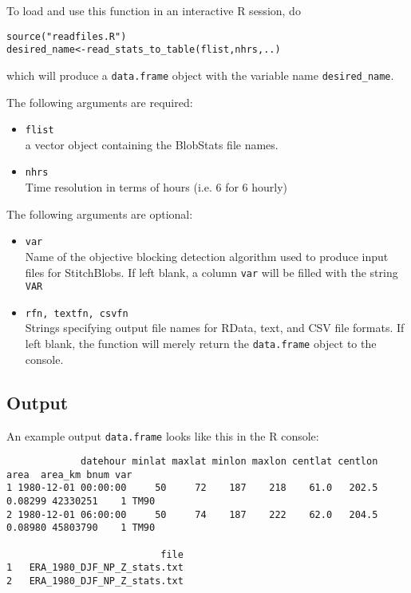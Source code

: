 \documentclass{article}
\begin{document}
To load and use  this function in an interactive R session, do
\begin{verbatim}
source("readfiles.R")
desired_name<-read_stats_to_table(flist,nhrs,..)
\end{verbatim}

which will produce a \texttt{data.frame} object with the variable name \texttt{desired\_name}.

The following arguments are required:
\begin{itemize}
\item[] \texttt{flist}\\ a vector object containing the BlobStats file names.
\item[] \texttt{nhrs}\\ Time resolution in terms of hours (i.e. 6 for 6 hourly)
\end{itemize}

The following arguments are optional:
\begin{itemize}
\item[] \texttt{var}\\ Name of the objective blocking detection algorithm used to produce input files for StitchBlobs. If left blank, a column \texttt{var} will be filled with the string \texttt{VAR}
\item[] \texttt{rfn, textfn, csvfn}\\Strings specifying output file names for RData, text, and CSV file formats. If left blank, the function will merely return the \texttt{data.frame} object to the console.
\end{itemize}

\subsection{Output}\label{tableoutput}

An example output \texttt{data.frame} looks like this in the R console:
\begin{verbatim}
             datehour minlat maxlat minlon maxlon centlat centlon    area  area_km bnum var
1 1980-12-01 00:00:00     50     72    187    218    61.0   202.5 0.08299 42330251    1 TM90
2 1980-12-01 06:00:00     50     74    187    222    62.0   204.5 0.08980 45803790    1 TM90

                           file
1   ERA_1980_DJF_NP_Z_stats.txt
2   ERA_1980_DJF_NP_Z_stats.txt
\end{verbatim}
\end{document}
